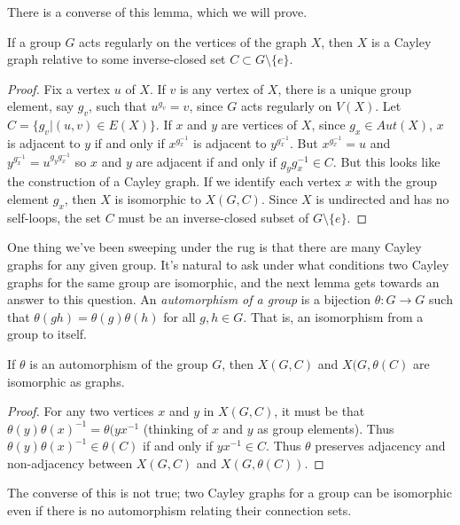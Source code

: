 There is a converse of this lemma, which we will prove.

\begin{lemma}
	If a group $G$ acts regularly on the vertices of the graph $X$, then $X$ is a Cayley graph relative to some inverse-closed set $C\subset G\setminus\{e\}$.
\end{lemma}
\begin{proof}
	Fix a vertex $u$ of $X$.  If $v$ is any vertex of $X$, there is a unique group element, say $g_v$, such that $u^{g_v} = v$, since $G$ acts regularly on $V(X)$.  Let $C=\{g_v|(u,v)\in E(X)\}$.  If $x$ and $y$ are vertices of $X$, since $g_x\in Aut(X)$, $x$ is adjacent to $y$ if and only if $x^{g_x^{-1}}$ is adjacent to $y^{g_x^{-1}}$.  But $x^{g_x^{-1}}=u$ and $y^{g_x^{-1}}=u^{g_yg_x^{-1}}$ so $x$ and $y$ are adjacent if and only if $g_yg_x^{-1}\in C$.  But this looks like the construction of a Cayley graph.  If we identify each vertex $x$ with the group element $g_x$, then $X$ is isomorphic to $X(G,C)$.  Since $X$ is undirected and has no self-loops, the set $C$ must be an inverse-closed subset of $G\setminus\{e\}$.
\end{proof}

One thing we've been sweeping under the rug is that there are many Cayley graphs for any given group.  It's natural to ask under what conditions two Cayley graphs for the same group are isomorphic, and the next lemma gets towards an answer to this question.  An \textit{automorphism of a group} is a bijection $\theta: G\rightarrow G$ such that $\theta(gh)=\theta(g)\theta(h)$ for all $g,h\in G$.  That is, an isomorphism from a group to itself.

\begin{lemma}
	If $\theta$ is an automorphism of the group $G$, then $X(G,C)$ and $X(G,\theta(C)$ are isomorphic as graphs.
	

\end{lemma}
\begin{proof}
	For any two vertices $x$ and $y$ in $X(G,C)$, it must be that $\theta(y)\theta(x)^{-1}=\theta(yx^{-1}$ (thinking of $x$ and $y$ as group elements).  Thus $\theta(y)\theta(x)^{-1}\in \theta(C)$ if and only if $yx^{-1}\in C$.  Thus $\theta$ preserves adjacency and non-adjacency between $X(G,C)$ and $X(G,\theta(C))$.
	
\end{proof}

The converse of this is not true; two Cayley graphs for a group can be isomorphic even if there is no automorphism relating their connection sets.

